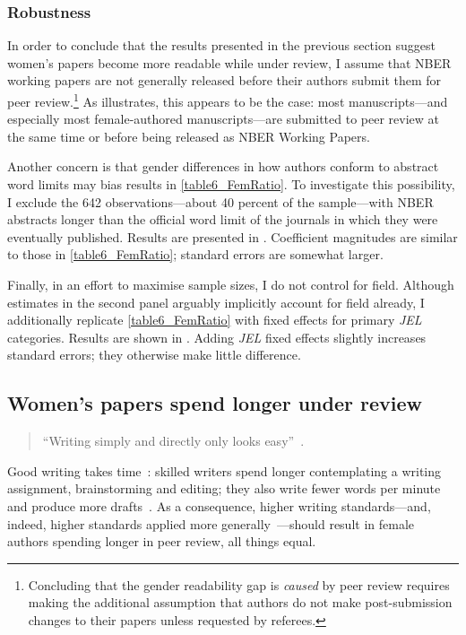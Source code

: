 \subsubsection{Robustness}
\label{nberrobustness}

In order to conclude that the results presented in the previous section suggest women's papers become more readable while under review, I assume that NBER working papers are not generally released before their authors submit them for peer review.\footnote{Concluding that the gender readability gap is \emph{caused} by peer review requires making the additional assumption that authors do not make post-submission changes to their papers unless requested by referees.} As  illustrates, this appears to be the case: most manuscripts---and especially most female-authored manuscripts---are submitted to peer review at the same time or before being released as NBER Working Papers.

Another concern is that gender differences in how authors conform to abstract word limits may bias results in \autoref{table6_FemRatio}. To investigate this possibility, I exclude the 642 observations---about 40 percent of the sample---with NBER abstracts longer than the official word limit of the journals in which they were eventually published. Results are presented in . Coefficient magnitudes are similar to those in \autoref{table6_FemRatio}; standard errors are somewhat larger.

Finally, in an effort to maximise sample sizes, I do not control for field. Although estimates in the second panel arguably implicitly account for field already, I additionally replicate \autoref{table6_FemRatio} with fixed effects for primary \emph{JEL} categories. Results are shown in . Adding \emph{JEL} fixed effects slightly increases standard errors; they otherwise make little difference.

\subsection{Women's papers spend longer under review}
\label{duration}

\begin{quote}

``Writing simply and directly only looks easy''~\citep[][p. 53]{Kimble1994}.
\end{quote}

Good writing takes time~\citep{Hartvigsen1981,Kroll1990}: skilled writers spend longer contemplating a writing assignment, brainstorming and editing; they also write fewer words per minute and produce more drafts~\citep{Faigley1981,Stallard1974}. As a consequence, higher writing standards---and, indeed, higher standards applied more generally~\citep[see, \emph{e.g.},][]{Card2020,Moon2020}---should result in female authors spending longer in peer review, all things equal.

